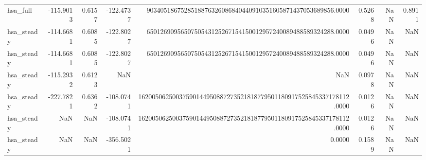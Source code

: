 \begin{tabular}{lrrrrrrr}
hsa\_full & -115.9013 & 0.6157 & -122.4737 & 9034051867528518876326086840440910351605871437053689856.0000 & 0.5268 & NaN & 0.8911 \\
hsa\_steady & -114.6681 & 0.6085 & -122.8027 & 6501269095650750543125267154150012957240089488589324288.0000 & 0.0496 & NaN & NaN \\
hsa\_steady & -114.6681 & 0.6085 & -122.8027 & 6501269095650750543125267154150012957240089488589324288.0000 & 0.0496 & NaN & NaN \\
hsa\_steady & -115.2932 & 0.6123 & NaN & NaN & 0.0978 & NaN & NaN \\
hsa\_steady & -227.7821 & 0.6362 & -108.0741 & 16200506250037590144950887273521818779501180917525845337178112.0000 & 0.0126 & NaN & NaN \\
hsa\_steady & NaN & NaN & -108.0741 & 16200506250037590144950887273521818779501180917525845337178112.0000 & 0.0126 & NaN & NaN \\
hsa\_steady & NaN & NaN & -356.5021 & 0.0000 & 0.1589 & NaN & NaN \\
\bottomrule
\end{tabular}
